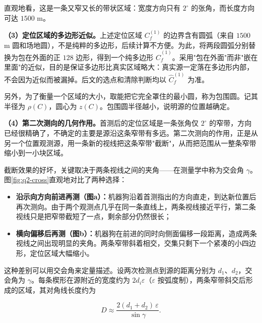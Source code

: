 直观地看，这是一条又窄又长的带状区域：宽度方向只有 $2^\circ$ 的张角，而长度方向可达 $1500$ m。

\textbf{（3）定位区域的多边形近似。}上述定位区域 $C_f^{(1)}$ 的边界含有圆弧（来自 $1500$ m 圆和场地圆），不是纯粹的多边形，后续计算不方便。为此，将两段圆弧分别替换为包在外面的正 $128$ 边形，得到一个纯多边形 $\widehat C_f^{(1)}$。采用"包在外面"而非"嵌在里面"的近似，目的是保证多边形比真实区域略大：真实源一定落在多边形内部，不会因为近似而被漏掉。后文的选点和清除判断均以 $\widehat C_f^{(1)}$ 为准。

另外，为了衡量一个区域的大小，取能把它完全罩住的最小圆，称为包围圆。记其半径为 $\rho(C)$，圆心为 $z(C)$。包围圆半径越小，说明源的位置越确定。

\textbf{（4）第二次测向的几何作用。}首测后的定位区域是一条张角仅 $2^\circ$ 的窄带，方向已经很精确了，不确定的主要是源沿这条窄带有多远。第二次测向的作用，正是从另一个位置观测源，用一条新的视线把这条窄带"截断"，从而把范围从一整条窄带缩小到一小块区域。

截断效果的好坏，关键取决于两条视线之间的夹角——在测量学中称为交会角 $\gamma$。图\ref{fig:q2-cross}直观地对比了两种选择：

\begin{itemize}
\item \textbf{沿示向方向前进再测（图a）：}机器狗沿着首测指出的方向直走，到达新位置后再次测向。由于两个观测点几乎在同一条直线上，两条视线接近平行，第二条视线只是把窄带截短了一点，剩余部分仍然很长；
\item \textbf{横向偏移后再测（图b）：}机器狗在前进的同时向侧面偏移一段距离，造成两条视线之间出现明显的夹角。两条窄带斜着相交，交集只剩下一个紧凑的小四边形，定位区域大幅缩小。
\end{itemize}

\begin{center}
\begin{minipage}{\linewidth}
\centering
\QTwoCrossFigure
{}
\label{fig:q2-cross}
\end{minipage}
\end{center}

这种差别可以用交会角来定量描述。设两次检测点到源的距离分别为 $d_1$、$d_2$，交会角为 $\gamma$。每条楔形在源附近的宽度约为 $2d_i\varepsilon$（$\varepsilon$ 按弧度制），两条窄带斜交后形成的区域，其对角线长度约为

\begin{equation}\label{eq:q2-2}
D\approx\frac{2(d_1+d_2)\,\varepsilon}{\sin\gamma}.
\end{equation}

